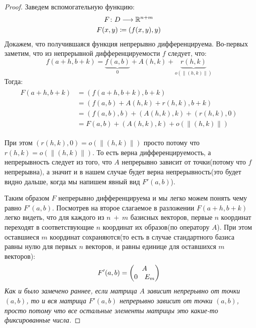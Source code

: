   \begin{proof}
    Заведем вспомогательную функцию:
    \begin{equation*}
      \begin{gathered}
        F\colon D \longrightarrow \mathbb{R}^{n + m} \\
        F(x, y) \coloneqq (f(x, y), y)
      \end{gathered}
    \end{equation*}
    Докажем, что получившаяся функция непрерывно дифференцируема. Во-первых заметим, что из непрерывной дифференцируемости $f$ следует, что:
    \begin{equation*}
      f(a + h, b + k) = \underbrace{f(a, b)}_{0} + A(h, k) + \underbrace{r(h, k)}_{o(\|(h, k)\|)}
    \end{equation*}
    Тогда:
    \begin{gather*}
        \begin{split}
            F(a + h, b + k) &= (f(a+h, b+k), b+k) \\
            &= (f(a, b) + A(h, k) + r(h, k), b+k) \\
            &= (f(a, b), b) + (A(h, k), k) + (r(h, k), 0) \\
            &= F(a, b) + (A(h, k), k) + o(\| (h, k) \|)
        \end{split}    
    \end{gather*}
    
    При этом $(r(h, k), 0) = o(\| (h, k) \|)$ просто потому что $r(h, k) = o(\| (h, k) \|)$. То есть верна дифференцируемость, а непрерывность следует из того, что $A$ непрерывно зависит от точки(потому что $f$ непрерывна), а значит и в нашем случае будет верна непрерывность(это будет видно дальше, когда мы напишем явный вид $F'(a, b)$).
  
    Таким образом $F$ непрерывно дифференцируема и мы легко можем понять чему равно $F'(a, b)$. Посмотрев на второе слагаемое в разложении $F(a + h, b + k)$ легко видеть, что для каждого из $n~+~m$ базисных векторов, первые $n$ координат переходят в соответствующие $n$ координат их образов(по оператору $A$). При этом оставшиеся $m$ координат сохраняются(то есть в случае стандартного базиса равны нулю для первых $n$ векторов, и равны единице для оставшихся $m$ векторов):
    \begin{equation*}
      F'(a, b) =
      \begin{pmatrix}
        \multicolumn{2}{c}{A} \\
        0 & E_m
      \end{pmatrix}
    \end{equation*}
    \textit{Как и было замечено раннее, если матрица $A$ зависит непрерывно от точки $(a, b)$, то и вся матрица $F'(a, b)$ непрерывно зависит от точки $(a, b)$, просто потому что все остальные элементы матрицы это какие-то фиксированные числа.}
  

\end{proof}
